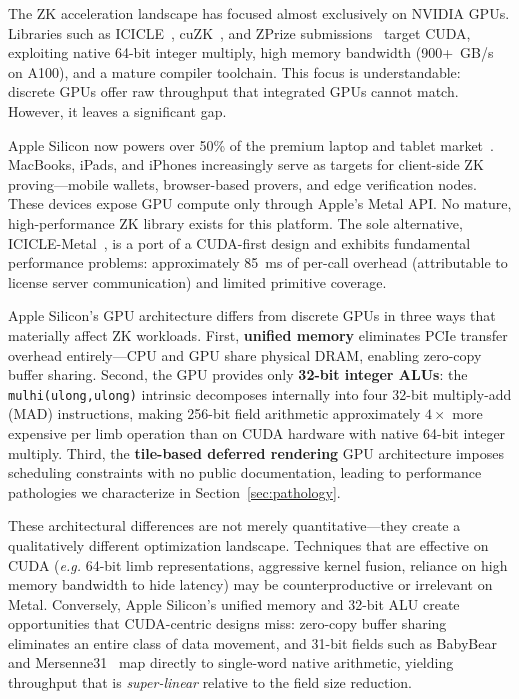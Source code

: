 \documentclass[letterpaper,twocolumn,10pt]{article}
\newcommand{\eg}{\textit{e.g.}\xspace}
\begin{document}
The ZK acceleration landscape has focused almost exclusively on NVIDIA GPUs.
Libraries such as ICICLE~\cite{icicle}, cuZK~\cite{cuzk}, and ZPrize
submissions~\cite{zprize2022,zprize2023} target CUDA, exploiting native
64-bit integer multiply, high memory bandwidth (900+~GB/s on A100), and a
mature compiler toolchain. This focus is understandable: discrete GPUs offer
raw throughput that integrated GPUs cannot match. However, it leaves a
significant gap.

Apple Silicon now powers over 50\% of the premium laptop and tablet
market~\cite{apple-market-share}. MacBooks, iPads, and iPhones increasingly
serve as targets for client-side ZK proving---mobile wallets, browser-based
provers, and edge verification nodes. These devices expose GPU compute only
through Apple's Metal API. No mature, high-performance ZK library exists for
this platform. The sole alternative, ICICLE-Metal~\cite{icicle}, is a
port of a CUDA-first design and exhibits fundamental performance
problems: approximately 85~ms of per-call overhead (attributable to license
server communication) and limited primitive coverage.

Apple Silicon's GPU architecture differs from discrete GPUs in three ways
that materially affect ZK workloads. First, \textbf{unified memory}
eliminates PCIe transfer overhead entirely---CPU and GPU share physical
DRAM, enabling zero-copy buffer sharing. Second, the GPU provides only
\textbf{32-bit integer ALUs}: the \texttt{mulhi(ulong,ulong)} intrinsic
decomposes internally into four 32-bit multiply-add (MAD) instructions,
making 256-bit field arithmetic approximately $4\times$ more expensive per
limb operation than on CUDA hardware with native 64-bit integer multiply.
Third, the \textbf{tile-based deferred rendering} GPU architecture imposes
scheduling constraints with no public documentation, leading to performance
pathologies we characterize in Section~\ref{sec:pathology}.

These architectural differences are not merely quantitative---they create a
qualitatively different optimization landscape. Techniques that are
effective on CUDA (\eg 64-bit limb representations, aggressive kernel
fusion, reliance on high memory bandwidth to hide latency) may be
counterproductive or irrelevant on Metal. Conversely, Apple Silicon's
unified memory and 32-bit ALU create opportunities that CUDA-centric
designs miss: zero-copy buffer sharing eliminates an entire class of data
movement, and 31-bit fields such as BabyBear~\cite{plonky3} and
Mersenne31~\cite{circle-stark} map directly to single-word native
arithmetic, yielding throughput that is \emph{super-linear} relative to the
field size reduction.
\end{document}
